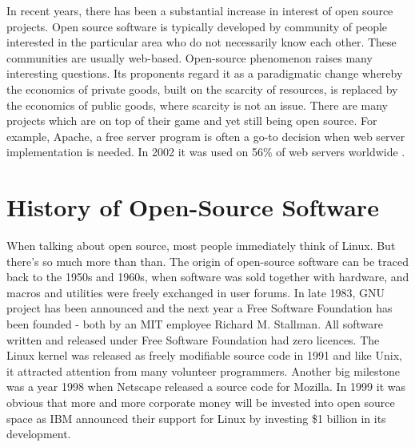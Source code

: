 In recent years, there has been a substantial increase in interest of open source projects. Open source software is typically developed by community of people interested in the particular area who do not necessarily know each other. These communities are usually web-based. Open-source phenomenon raises many interesting questions. Its proponents regard it as a paradigmatic change whereby the economics of private goods, built on the scarcity of resources, is replaced by the economics of public goods, where scarcity is not an issue. \cite{alexander2002working} There are many projects which are on top of their game and yet still being open source. For example, Apache, a free server program is often a go-to decision when web server implementation is needed. In 2002 it was used on 56\% of web servers worldwide \cite{lerner2001open}.

\section{History of Open-Source Software}
When talking about open source, most people immediately think of Linux. But there's so much more than than. The origin of open-source software can be traced back to the 1950s and 1960s, when software was sold together with hardware, and macros and utilities were freely exchanged in user forums. \cite{alexander2002working} In late 1983, GNU project has been announced and the next year a Free Software Foundation has been founded - both by an MIT employee Richard M. Stallman. All software written and released under Free Software Foundation had zero licences. The Linux kernel was released as freely modifiable source code in 1991 and like Unix, it attracted attention from many volunteer programmers. Another big milestone was a year 1998 when Netscape released a source code for Mozilla. In 1999 it was obvious that more and more corporate money will be invested into open source space as IBM announced their support for Linux by investing \$1 billion in its development.

